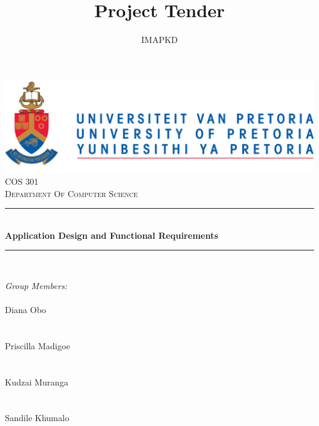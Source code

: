 \documentclass[a4paper,12pt]{article}
\author{IMAPKD}
\title{ Project Tender}
\newcommand{\HRule}{\rule{\linewidth}{0.5mm}}
\begin{document}
\setlength{\parskip}{6pt}

\begin{titlepage}

\begin{center}
\includegraphics[width=1\textwidth]{./University_of_Pretoria_Logo.PNG}\\[0.4cm]  
\textsc{\LARGE COS 301}\\[0.9cm]
\textsc{\LARGE Department Of Computer Science}\\[0.3cm]


\HRule \\[0.4cm]
{ \huge \bfseries Application Design and Functional Requirements}\\[0.1cm]
\HRule \\[0.4cm]  


\begin{minipage}{0.4\textwidth}
\begin{flushleft} \large

\emph{\Large Group Members:}\\[0.4cm]    
\emph{}\\
{\Large Diana {Obo}} \\
\emph{}\\
\emph{}\\
{\Large Priscilla {Madigoe}}\\
\emph{}\\
\emph{}\\
{\Large Kudzai {Muranga}} \\
\emph{}\\
\emph{}\\
{\Large Sandile {Khumalo}}\\
\emph{}\\
\emph{}\\

\end{flushleft}
\end{minipage}
\begin{minipage}{0.4\textwidth}
\begin{flushright} \large


\end{flushright}
\end{minipage}
\end{center}
\end{titlepage}
\end{document}
